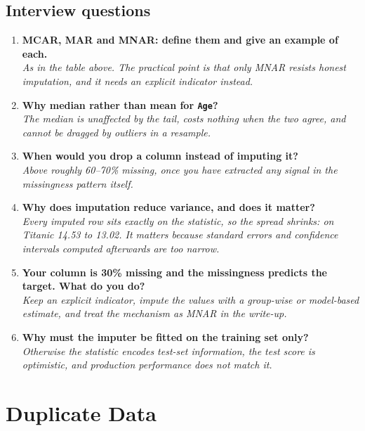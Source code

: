 \documentclass[11pt,a4paper]{article}
\begin{document}
\subsection*{Interview questions}

\begin{enumerate}\itemsep4pt
  \item \textbf{MCAR, MAR and MNAR: define them and give an example of each.}\\
        \emph{As in the table above. The practical point is that only MNAR resists honest
        imputation, and it needs an explicit indicator instead.}
  \item \textbf{Why median rather than mean for \texttt{Age}?}\\
        \emph{The median is unaffected by the tail, costs nothing when the two agree, and
        cannot be dragged by outliers in a resample.}
  \item \textbf{When would you drop a column instead of imputing it?}\\
        \emph{Above roughly 60--70\% missing, once you have extracted any signal in the
        missingness pattern itself.}
  \item \textbf{Why does imputation reduce variance, and does it matter?}\\
        \emph{Every imputed row sits exactly on the statistic, so the spread shrinks: on
        Titanic 14.53 to 13.02. It matters because standard errors and confidence intervals
        computed afterwards are too narrow.}
  \item \textbf{Your column is 30\% missing and the missingness predicts the target. What
        do you do?}\\
        \emph{Keep an explicit indicator, impute the values with a group-wise or model-based
        estimate, and treat the mechanism as MNAR in the write-up.}
  \item \textbf{Why must the imputer be fitted on the training set only?}\\
        \emph{Otherwise the statistic encodes test-set information, the test score is
        optimistic, and production performance does not match it.}
\end{enumerate}


\newpage
\section{Duplicate Data}

\end{document}
